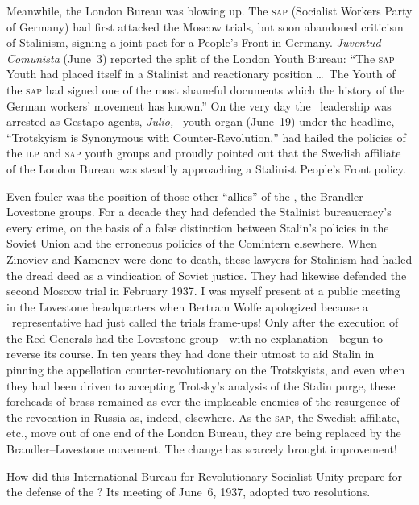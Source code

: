 Meanwhile, the London Bureau was blowing up. The \textsc{sap} (Socialist Workers Party of Germany) had first attacked the Moscow trials, but soon abandoned criticism of Stalinism, signing a joint pact for a People’s Front in Germany. \emph{Juventud Comunista} (June~3) reported the split of the London Youth Bureau: ``The \textsc{sap} Youth had placed itself in a Stalinist and reactionary position \dots\ The Youth of the \textsc{sap} had signed one of the most shameful documents which the history of the German workers’ movement has known.'' On the very day the \POUM\ leadership was arrested as Gestapo agents, \emph{Julio,} \PSUC\ youth organ (June~19) under the headline, ``Trotskyism is Synonymous with Counter-Revolution,'' had hailed the policies of the \textsc{ilp} and \textsc{sap} youth groups and proudly pointed out that the Swedish affiliate of the London Bureau was steadily approaching a Stalinist People’s Front policy.

Even fouler was the position of those other ``allies'' of the \POUM\kn, the Brandler–Lovestone groups. For a decade they had defended the Stalinist bureaucracy’s every crime, on the basis of a false distinction between Stalin’s policies in the Soviet Union and the erroneous policies of the Comintern elsewhere. When Zinoviev and Kamenev were done to death, these lawyers for Stalinism had hailed the dread deed as a vindication of Soviet justice. They had likewise defended the second Moscow trial in February 1937. I was myself present at a public meeting in the Lovestone headquarters when Bertram Wolfe apologized because a \POUM\ representative had just called the trials frame-ups! Only after the execution of the Red Generals had the Lovestone group—with no explanation—begun to reverse its course. In ten years they had done their utmost to aid Stalin in pinning the appellation counter-revolutionary on the Trotskyists, and even when they had been driven to accepting Trotsky’s analysis of the Stalin purge, these foreheads of brass remained as ever the implacable enemies of the resurgence of the revocation in Russia as, indeed, elsewhere. As the \textsc{sap,} the Swedish affiliate, etc., move out of one end of the London Bureau, they are being replaced by the Brandler–Lovestone movement. The change has scarcely brought improvement!

How did this International Bureau for Revolutionary Socialist Unity prepare for the defense of the \POUM? Its meeting of June~6, 1937, adopted two resolutions.


